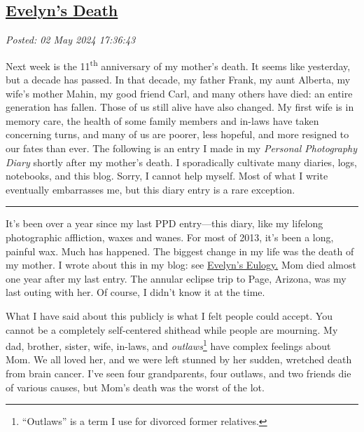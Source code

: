 %

\subsection*{\href{http://analyzethedatanotthedrivel.org/2024/05/02/evelyns-death/}{Evelyn's Death}}


\noindent\emph{Posted: 02 May 2024 17:36:43}
\vspace{6pt}

Next week is the 11\textsuperscript{th} anniversary of my mother's
death. It seems like yesterday, but a decade has passed. In that decade,
my father Frank, my aunt Alberta, my wife's mother Mahin, my good friend
Carl, and many others have died: an entire generation has fallen. Those
of us still alive have also changed. My first wife is in memory care,
the health of some family members and in-laws have taken concerning
turns, and many of us are poorer, less hopeful, and more resigned to our
fates than ever. The following is an entry I made in my \emph{Personal
Photography Diary} shortly after my mother's death. I sporadically
cultivate many diaries, logs, notebooks, and this blog. Sorry, I cannot
help myself. Most of what I write eventually embarrasses me, but this
diary entry is a rare exception.

\begin{center}\rule{0.5\linewidth}{0.5pt}\end{center}

It's been over a year since my last PPD entry---this diary, like my
lifelong photographic affliction, waxes and wanes. For most of 2013,
it's been a long, painful wax. Much has happened. The biggest change in
my life was the death of my mother. I wrote about this in my blog: see
\href{http://bakerjd99.wordpress.com/2013/05/15/evelyns-eulogy/}{Evelyn's
Eulogy.} Mom died almost one year after my last entry. The annular
eclipse trip to Page, Arizona, was my last outing with her. Of course, I
didn't know it at the time.

What I have said about this publicly is what I felt people could accept.
You cannot be a completely self-centered shithead while people are
mourning. My dad, brother, sister, wife, in-laws, and
\emph{outlaws}\footnote{``Outlaws'' is a term I use for divorced former relatives.}
have complex feelings about Mom. We all loved her, and we were left
stunned by her sudden, wretched death from brain cancer. I've seen four
grandparents, four outlaws, and two friends die of various causes, but
Mom's death was the worst of the lot.

